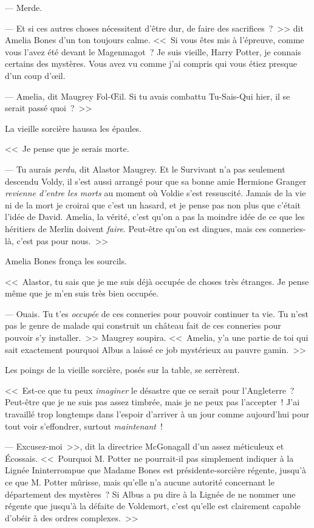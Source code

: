 --- Merde.

--- Et si ces autres choses nécessitent d'être dur, de faire des sacrifices~?~>> dit Amelia Bones d'un ton toujours calme. <<~Si vous êtes mis à l'épreuve, comme vous l'avez été devant le Magenmagot~? Je suis vieille, Harry Potter, je connais certains des mystères. Vous avez vu comme j'ai compris qui vous étiez presque d'un coup d'œil.

--- Amelia, dit Maugrey Fol-Œil. Si tu avais combattu Tu-Sais-Qui hier, il se serait passé quoi~?~>>

La vieille sorcière haussa les épaules.

<<~Je pense que je serais morte.

--- Tu aurais \emph{perdu}, dit Alastor Maugrey. Et le Survivant n'a pas seulement descendu Voldy, il s'est aussi arrangé pour que sa bonne amie Hermione Granger \emph{revienne d'entre les morts} au moment où Voldie s'est ressuscité. Jamais de la vie ni de la mort je croirai que c'est un hasard, et je pense pas non plus que c'était l'idée de David. Amelia, la vérité, c'est qu'on a pas la moindre idée de ce que les héritiers de Merlin doivent \emph{faire}. Peut-être qu'on est dingues, mais ces conneries-là, c'est pas pour nous.~>>

Amelia Bones fronça les sourcils.

<<~Alastor, tu sais que je me suis déjà occupée de choses très étranges. Je pense même que je m'en suis très bien occupée.

--- Ouais. Tu t'es \emph{occupée} de ces conneries pour pouvoir continuer ta vie. Tu n'est pas le genre de malade qui construit un château fait de ces conneries pour pouvoir s'y installer.~>> Maugrey soupira. <<~Amelia, y'a une partie de toi qui sait exactement pourquoi Albus a laissé ce job mystérieux au pauvre gamin.~>>

Les poings de la vieille sorcière, posés sur la table, se serrèrent.

<<~Est-ce que tu peux \emph{imaginer} le désastre que ce serait pour l'Angleterre~? Peut-être que je ne suis pas assez timbrée, mais je ne peux pas l'accepter~! J'ai travaillé trop longtemps dans l'espoir d'arriver à un jour comme aujourd'hui pour tout voir s'effondrer, surtout \emph{maintenant}~!

--- Excusez-moi~>>, dit la directrice McGonagall d'un assez méticuleux et Écossais. <<~Pourquoi M. Potter ne pourrait-il pas simplement indiquer à la Lignée Ininterrompue que Madame Bones est présidente-sorcière régente, jusqu'à ce que M. Potter mûrisse, mais qu'elle n'a aucune autorité concernant le département des mystères~? Si Albus a pu dire à la Lignée de ne nommer une régente que jusqu'à la défaite de Voldemort, c'est qu'elle est clairement capable d’obéir à des ordres complexes.~>>


